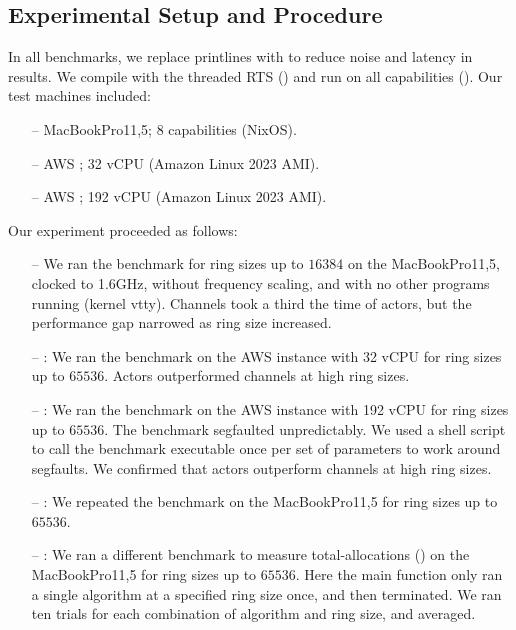 \documentclass[sigplan,screen]{acmart}
\begin{document}
\subsection{Experimental Setup and Procedure}
\label{apx:exp-setup}

In all benchmarks, we replace printlines with 
to reduce noise and latency in results.
We compile with the threaded RTS () and run on all capabilities
().
Our test machines included:
%
\begin{itemize}[leftmargin=1em]
    \item[--] MacBookPro11,5; 8 capabilities (NixOS).
    \item[--] AWS ; 32 vCPU (\small{Amazon Linux 2023 AMI}).
    \item[--] AWS ; 192 vCPU (\small{Amazon Linux 2023 AMI}).
\end{itemize}
%
Our experiment proceeded as follows:
%
\begin{itemize}[leftmargin=1em]
    \item[--] We ran the  benchmark for ring sizes up to
    $16384$ on the MacBookPro11,5, clocked to 1.6GHz, without
    frequency scaling, and with no other programs running (kernel vtty).
    Channels took a third the time of actors, but
    the performance gap narrowed as ring size increased.

    \item[--] :
    We ran the benchmark on the AWS  instance with 32 vCPU
    for ring sizes up to $65536$.
    Actors outperformed channels at high ring sizes.

    \item[--] :
    We ran the benchmark on the AWS  instance with 192 vCPU
    for ring sizes up to $65536$.
    The benchmark segfaulted unpredictably.
    We used a shell script to call the benchmark executable once per set of
    parameters to work around segfaults.
    We confirmed that actors outperform channels at high ring sizes.

    \item[--] :
    We repeated the benchmark on the MacBookPro11,5
    for ring sizes up to $65536$.

    \item[--] :
    We ran a different benchmark
    to measure total-allocations ()
    on the MacBookPro11,5
    for ring sizes up to $65536$.
    Here the main function only ran a single algorithm at a
    specified ring size once, and then terminated.
    We ran ten trials for each combination of algorithm and ring size, and averaged.
\end{itemize}
\end{document}
